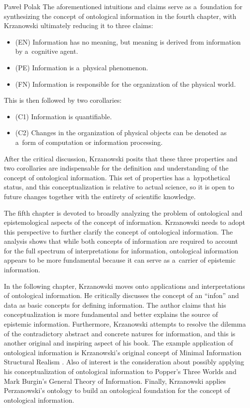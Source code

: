 \begin{newrevengenv}{Paweł Polak}
The aforementioned intuitions and claims serve as a~foundation for synthesizing the concept of ontological information in the fourth chapter, with Krzanowski ultimately reducing it to three claims:

\begin{itemize}
\item (EN) Information has no meaning, but meaning is derived from information by a~cognitive agent.
\item (PE) Information is a~physical phenomenon.
\item (FN) Information is responsible for the organization of the physical world.
\end{itemize}
This is then followed by two corollaries:

\begin{itemize}
\item (C1) Information is quantifiable.
\item (C2) Changes in the organization of physical objects can be denoted as a~form of computation or information processing.
\end{itemize}
After the critical discussion, Krzanowski posits that these three properties and two corollaries are indispensable for the definition and understanding of the concept of ontological information. This set of properties has a~hypothetical status, and this conceptualization is relative to actual science, so it is open to future changes together with the entirety of scientific knowledge.

The fifth chapter is devoted to broadly analyzing the problem of ontological and epistemological aspects of the concept of information. Krzanowski needs to adopt this perspective to further clarify the concept of ontological information. The analysis shows that while both concepts of information are required to account for the full spectrum of interpretations for information, ontological information appears to be more fundamental because it can serve as a~carrier of epistemic information.

In the following chapter, Krzanowski moves onto applications and interpretations of ontological information. He critically discusses the concept of an ``infon'' and data as basic concepts for defining information. The author claims that his conceptualization is more fundamental and better explains the source of epistemic information. Furthermore, Krzanowski attempts to resolve the dilemma of the contradictory abstract and concrete natures for information, and this is another original and inspiring aspect of his book. The example application of ontological information is Krzanowski's original concept of Minimal Information Structural Realism
\parencite[first introduced in][]{krzanowski_minimal_2017}. %
 Also of interest is the consideration about possibly applying his conceptualization of ontological information to Popper's Three Worlds and Mark Burgin's General Theory of Information. Finally, Krzanowski applies Perzanowski's ontology to build an ontological foundation for the concept of ontological information.


\end{newrevengenv}
